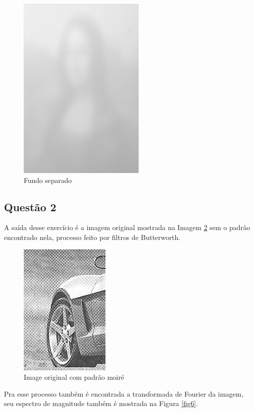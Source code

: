 \documentclass[conference]{IEEEtran}
\begin{document}
\begin{figure}[h]
    \centering
    \includegraphics[scale=0.8]{data/fundo1.png}
    \caption{Fundo separado}
    \label{fig4}
\end{figure}

\subsection{Questão 2}

A saída desse exercício é a imagem original mostrada na Imagem \ref{fig5} sem o padrão encontrado nela, 
processo feito por filtros de Butterworth.
\begin{figure}[h]
    \centering
    \includegraphics[scale=1]{data/moire.png}
    \caption{Image original com padrão moiré}
    \label{fig5}
\end{figure}

Pra esse processo também é encontrada a transformada de Fourier da imagem,
seu espectro de magnitude também é mostrada na Figura \ref{fig6}. 
\end{document}
